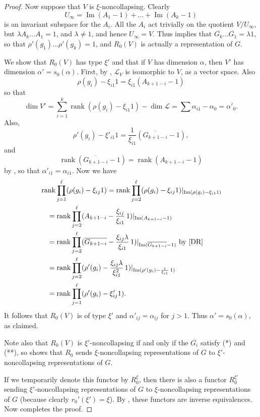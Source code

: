 \documentclass{amsart}
\theoremstyle{plain}
\theoremstyle{definition}
\theoremstyle{remark}
\DeclareMathOperator{\Ima}{Im}
\DeclareMathOperator{\rank}{rank}
\begin{document}
\begin{proof}
Now suppose that $V$ is $\xi$-noncollapsing. Clearly
\[
U_\infty = \Ima(A_1-1) + \dots + \Ima(A_k-1)
\]
is an invariant subspace for the $A_i$. All
the $A_i$ act trivially on the quotient $V/U_\infty$, but
$\lambda A_k\dots A_1=1$, and $\lambda\neq 1$, and hence $U_\infty=V$.
Thus \cite[Lemma 4.1(b)]{DR} implies that $\overline{G_k} \dots \overline{G_1} = \lambda 1$,
so that $\rho'(g_1)\dots \rho'(g_k) = 1$, and $R_0(V)$ is actually a representation of $G$.

We show that $R_0(V)$ has type $\xi'$ and that if $V$ has dimension $\alpha$, then $V'$ has
dimension $\alpha'=s_0(\alpha)$.
First, by \cite[Lemma 2.7]{DR}, $\mathcal{L}_V$ is isomorphic to $V$, as a vector
space. Also
\[
\rho(g_i) - \xi_{i1} 1 = \xi_{i1} (A_{k+1-i}-1)
\]
so that
\[
\dim V' = \sum_{i=1}^k \rank(\rho(g_i) - \xi_{i1} 1) - \dim \mathcal{L} = \sum \alpha_{i1} - \alpha_0 = \alpha'_0.
\]
Also,
\[
\rho'(g_i)-\xi'_{i1}1 = \frac{1}{\xi_{i1}} (\overline{G_{k+1-i}}-1),
\]
and
\[
\rank(\overline{G_{k+1-i}}-1) = \rank(A_{k+1-i}-1)
\]
by \cite[Lemma 4.2(a)]{DR}, so that $\alpha'_{i1} = \alpha_{i1}$.
Now we have
%
\begin{align*}
&\rank \prod_{j=1}^\ell(\rho(g_i)-\xi_{ij}1)
= \rank \prod_{j=2}^\ell(\rho(g_i)-\xi_{ij}1)|_{\Ima (\rho(g_i)-\xi_{i1}1)}
\\
&\quad= \rank \prod_{j=2}^\ell(A_{k+1-i}-\frac{\xi_{ij}}{\xi_{i1}} \, 1)
|_{\Ima (A_{k+1-i}-1)}
\\
&\quad=\rank \prod_{j=2}^\ell
(\overline{G_{k+1-i}}-\frac{\xi_{ij}\lambda}{\xi_{i1}} \, 1)
|_{\Ima (\overline{G_{k+1-i}}-1)}
\text{ by \cite[Lemma 4.1(a)]{DR}}
\\
&\quad= \rank \prod_{j=2}^\ell
(\rho'(g_i)-\frac{\xi_{ij}\lambda}{\xi_{i1}^2} \, 1)
|_{\Ima (\rho'(g_i)-\frac{1}{\xi_{i1}} \, 1)}
\\
&\quad= \rank \prod_{j=1}^\ell (\rho'(g_i)-\xi'_{ij} 1).
\end{align*}
%
It follows that $R_0(V)$ is of type $\xi'$ and $\alpha'_{ij} = \alpha_{ij}$
for $j>1$. Thus $\alpha' = s_0(\alpha)$, as claimed.


Note also that $R_0(V)$ is $\xi'$-noncollapsing if and only if the $\overline{G_i}$
satisfy (*) and (**), so \cite[Proposition]{DR} shows that $R_0$ sends $\xi$-noncollapsing
representations of $G$ to $\xi'$-noncollapsing representations of $G$.

If we temporarily denote this functor by $R_0^\xi$, then there is also
a functor $R_0^{\xi'}$ sending $\xi'$-noncollapsing
representations of $G$ to $\xi$-noncollapsing representations of $G$
(because clearly $r_0'(\xi')=\xi$). By \cite[Theorem 3.5 and Proposition 3.2]{DR},
these functors are inverse equivalences.
Now \cite[Corollary 3.6]{DR} completes the proof.
\end{proof}
\end{document}
